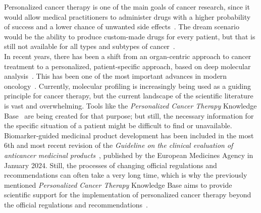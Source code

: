 Personalized cancer therapy is one of the main goals of cancer research, since it would allow medical practitioners to administer drugs with a higher probability of success and a lower chance of unwanted side effects~\cite{meric2012overcoming}. The dream scenario would be the ability to produce custom-made drugs for every patient, but that is still not available for all types and subtypes of cancer~\cite{personalized_cancer_medicine}.\\
In recent years, there has been a shift from an organ-centric approach to cancer treatment to a personalized, patient-specific approach, based on deep molecular analysis~\cite{personlized-medicine-recent-progress-cancer}. This has been one of the most important advances in modern oncology~\cite{personlized-medicine-recent-progress-cancer}. Currently, molecular profiling is increasingly being used as a guiding principle for cancer therapy, but the current landscape of the scientific literature is vast and overwhelming. Tools like the \textit{Personalized Cancer Therapy} Knowledge Base~\cite{personalized-cancer-therapy} are being created for that purpose; but still, the necessary information for the specific situation of a patient might be difficult to find or unavailable. Biomarker-guided medicinal product development has been included in the most 6th and most recent revision of the \textit{Guideline on the clinical evaluation of anticancer medicinal products}~\cite{ema_guideline}, published by the European Medicines Agency in January 2024. Still, the processes of changing official regulations and recommendations can often take a very long time, which is why the previously mentioned \textit{Personalized Cancer Therapy} Knowledge Base aims to provide scientific support for the implementation of personalized cancer therapy beyond the official regulations and recommendations~\cite{personalized-cancer-therapy}.

